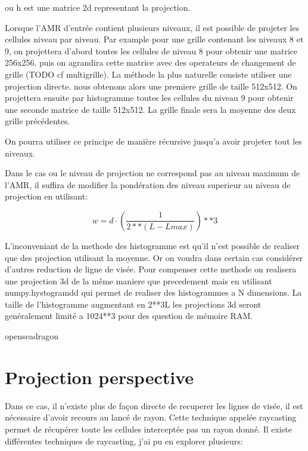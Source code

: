ou h est une matrice 2d representant la projection.


Lorsque l'AMR d'entrée contient plusieurs niveaux, il est possible de projeter les cellules niveau par niveau.
Par example pour une grille contenant les niveaux 8 et 9, on projettera d'abord toutes les cellules de niveau 8 pour obtenir une matrice 256x256.
puis on agrandira cette matrice avec des operateurs de changement de grille (TODO cf multigrille).
La méthode la plus naturelle consiste utiliser une projection directe.
nous obtenons alors une premiere grille de taille 512x512.
On projettera ensuite par histogramme toutes les cellules du niveau  9 pour obtenir une seconde matrice de taille 512x512.
La grille finale sera la moyenne des deux grille précédentes.

On pourra utiliser ce principe de manière récursive jusqu'a avoir projeter tout les niveaux.

Dans le cas ou le niveau de projection ne correspond pas au niveau maximum de l'AMR, il suffira de modifier la pondération des niveau superieur au niveau de projection en utilisant:

\begin{equation}
w = d \cdot \left( \frac{1}{2**(L-Lmax) }\right) **3
\end{equation}



L'inconveniant de la methode des histogramme est qu'il n'est possible de realiser que des projection utilisant la moyenne.
Or on voudra dans certain cas considérer d'autres reduction de ligne de visée.
Pour compenser cette methode on realisera une projection 3d de la même maniere que precedement mais en utilisant numpy.hystogramdd qui permet de realiser des histogrammes a N dimensions.
La taille de l'histogramme augmentant en 2**3L les projections 3d seront genéralement limité a 1024**3 pour des question de mémoire RAM. 





openseadragon
%








\section{Projection perspective}

Dans ce cas, il n'existe plus de façon directe de recuperer les lignes de visée, il est nécessaire d'avoir recours au lancé de rayon.
Cette technique appelée raycasting permet de récupérer toute les cellules interceptée pas un rayon donné.
Il existe différentes techniques de raycasting, j'ai pu en explorer plusieurs:

